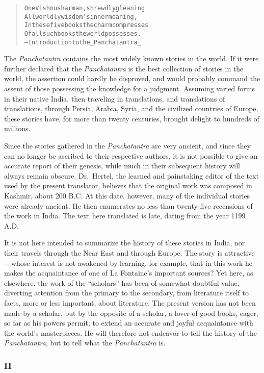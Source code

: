 \documentclass[article, twoside, 14pt]{memoir}
\renewenvironment{verbatim}{%
\begin{quote}%
\vskip -10pt%
\begin{alltt}\normalfont\large}{\end{alltt}%
\end{quote}%
\vskip -10pt
} %
\begin{document}
\begin{verbatim}
One Vishnusharman, shrewdly gleaning
All worldly wisdom's inner meaning,
In these five books the charm compresses
Of all such books the world possesses.
        --Introduction to the _Panchatantra_
\end{verbatim}
The \emph{Panchatantra} contains the most widely known stories in
the world. If it were further declared that the \emph{Panchatantra}
is the best collection of stories in the world, the assertion could
hardly be disproved, and would probably command the assent of those
possessing the knowledge for a judgment. Assuming varied forms in
their native India, then traveling in translations, and
translations of translations, through Persia, Arabia, Syria, and
the civilized countries of Europe, these stories have, for more
than twenty centuries, brought delight to hundreds of millions.

Since the stories gathered in the \emph{Panchatantra} are very
ancient, and since they can no longer be ascribed to their
respective authors, it is not possible to give an accurate report
of their genesis, while much in their subsequent history will
always remain obscure. Dr.~Hertel, the learned and painstaking
editor of the text used by the present translator, believes that
the original work was composed in Kashmir, about 200 B.C. At this
date, however, many of the individual stories were already ancient.
He then enumerates no less than twenty-five recensions of the work
in India. The text here translated is late, dating from the year
1199 A.D.

It is not here intended to summarize the history of these stories
in India, nor their travels through the Near East and through
Europe. The story is attractive---whose interest is not awakened by
learning, for example, that in this work he makes the acquaintance
of one of La Fontaine's important sources? Yet here, as elsewhere,
the work of the ``scholars'' has been of somewhat doubtful value,
diverting attention from the primary to the secondary, from
literature itself to facts, more or less important, about
literature. The present version has not been made by a scholar, but
by the opposite of a scholar, a lover of good books, eager, so far
as his powers permit, to extend an accurate and joyful acquaintance
with the world's masterpieces. He will therefore not endeavor to
tell the history of the \emph{Panchatantra}, but to tell what the
\emph{Panchatantra} is.

\subsubsection{II}
\end{document}
